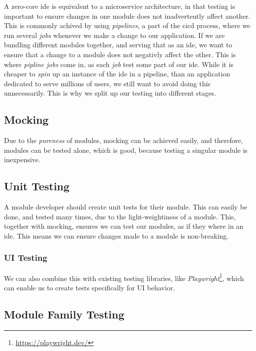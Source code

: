 A zero-core \gls{ide} is equivalent to a microservice architecture, in that
testing is important to ensure changes in one module does not inadvertently
affect another. This is commonly achived by using \textit{pipelines}, a part
of the \gls{cicd} process, where we run several \textit{jobs} whenever we make a
change to our application. If we are bundling different modules together, and
serving that as an \gls{ide}, we want to ensure that a change to a module does
not negativly affect the other. This is where \textit{pipline jobs} come in, as
each \textit{job} test some part of our \gls{ide}. While it is cheaper to
\textit{spin} up an instance of the \gls{ide} in a pipeline, than an application
dedicated to serve millions of users, we still want to avoid doing this
unnecessarily. This is why we split up our testing into different stages.

\subsection{Mocking}

Due to the \textit{pureness} of modules, mocking can be achieved easily, and
therefore, modules can be tested alone, which is good, because testing a
singular module is inexpensive.

\subsection{Unit Testing}

A module developer should create unit tests for their module. This can easily be
done, and tested many times, due to the light-weightiness of a module. This,
together with mocking, ensures we can test our modules, as if they where in an
\gls{ide}. This means we can ensure changes made to a module is non-breaking.

\subsubsection{UI Testing}

We can also combine this with existing testing libraries, like \textit{Playwright}\footnote{\url{https://playwright.dev/}},
which can enable us to create tests specifically for UI behavior.

\subsection{Module Family Testing}

